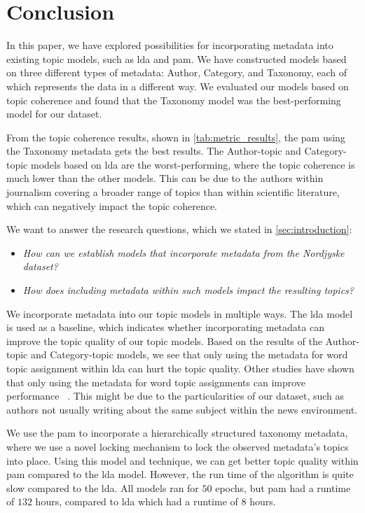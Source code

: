 \section{Conclusion}\label{sec:conclusion}
In this paper, we have explored possibilities for incorporating metadata into existing topic models, such as \gls{lda} and \gls{pam}.
We have constructed models based on three different types of metadata: Author, Category, and Taxonomy, each of which represents the data in a different way.
We evaluated our models based on topic coherence and found that the Taxonomy model was the best-performing model for our dataset.

From the topic coherence results, shown in \autoref{tab:metric_results}, the \acrfull{pam} using the Taxonomy metadata gets the best results.
The Author-topic and Category-topic models based on \gls{lda} are the worst-performing, where the topic coherence is much lower than the other models. 
This can be due to the authors within journalism covering a broader range of topics than within scientific literature, which can negatively impact the topic coherence.

We want to answer the research questions, which we stated in \autoref{sec:introduction}:

\begin{itemize}	
    \item \textit{How can we establish models that incorporate metadata from the Nordjyske dataset?}	
    \item \textit{How does including metadata within such models impact the resulting topics?}
 \end{itemize}

We incorporate metadata into our topic models in multiple ways.
The \gls{lda} model is used as a baseline, which indicates whether incorporating metadata can improve the topic quality of our topic models.
Based on the results of the Author-topic and Category-topic models, we see that only using the metadata for word topic assignment within \gls{lda} can hurt the topic quality.
Other studies have shown that only using the metadata for word topic assignments can improve performance~\cite{MetaLDA2017} \cite{author_topic_2012}.
This might be due to the particularities of our dataset, such as authors not usually writing about the same subject within the news environment.  


We use the \gls{pam} to incorporate a hierarchically structured taxonomy metadata, where we use a novel locking mechanism to lock the observed metadata's topics into place.
Using this model and technique, we can get better topic quality within \gls{pam} compared to the \gls{lda} model.
However, the run time of the algorithm is quite slow compared to the \gls{lda}.
All models ran for $50$ epochs, but \gls{pam} had a runtime of $132$ hours, compared to \gls{lda} which had a runtime of $8$ hours.

